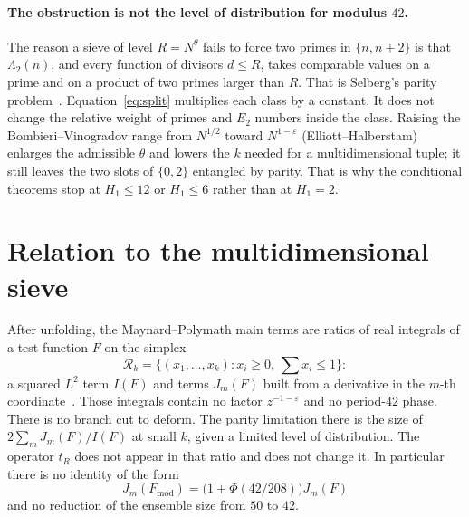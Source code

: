 \documentclass[11pt,a4paper]{article}
\theoremstyle{plain}
\theoremstyle{definition}
\theoremstyle{plain}
\numberwithin{equation}{section}
\begin{document}
\paragraph{The obstruction is not the level of distribution for modulus \(42\).}
The reason a sieve of level \(R=N^{\theta}\) fails to force two primes in \(\{n,n+2\}\) is that \(\Lambda_2(n)\), and every function of divisors \(d\le R\), takes comparable values on a prime and on a product of two primes larger than \(R\). That is Selberg's parity problem~\cite{Selberg1991,Greaves2001}. Equation~\eqref{eq:split} multiplies each class by a constant. It does not change the relative weight of primes and \(E_2\) numbers inside the class. Raising the Bombieri--Vinogradov range from \(N^{1/2}\) toward \(N^{1-\varepsilon}\) (Elliott--Halberstam) enlarges the admissible \(\theta\) and lowers the \(k\) needed for a multidimensional tuple; it still leaves the two slots of \(\{0,2\}\) entangled by parity. That is why the conditional theorems stop at \(H_1\le 12\) or \(H_1\le 6\) rather than at \(H_1=2\).

\section{Relation to the multidimensional sieve}

After unfolding, the Maynard--Polymath main terms are ratios of real integrals of a test function \(F\) on the simplex
\[
\mathcal{R}_k=\bigl\{(x_1,\ldots,x_k):x_i\ge 0,\ \textstyle\sum x_i\le 1\bigr\}:
\]
a squared \(L^2\) term \(I(F)\) and terms \(J_m(F)\) built from a derivative in the \(m\)-th coordinate~\cite{Maynard2015,Polymath8b}. Those integrals contain no factor \(z^{-1-\varepsilon}\) and no period-\(42\) phase. There is no branch cut to deform. The parity limitation there is the size of \(2\sum_m J_m(F)/I(F)\) at small \(k\), given a limited level of distribution. The operator \(t_R\) does not appear in that ratio and does not change it. In particular there is no identity of the form
\[
J_m(F_{\mathrm{mod}})=\bigl(1+\Phi(42/208)\bigr)J_m(F)
\]
and no reduction of the ensemble size from \(50\) to \(42\).
\end{document}
